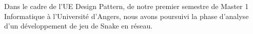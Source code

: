 \par
Dans le cadre de l'UE Design Pattern, de notre premier semestre de Master 1 Informatique à l'Université d'Angers, nous avons poursuivi la phase d'analyse d'un développement de jeu de Snake en réseau.